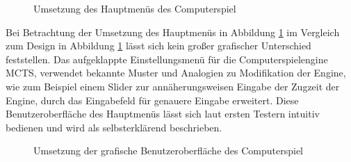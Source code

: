 \begin{figure}[!ht]
    \centering
    \caption{Umsetzung des Hauptmenüs des Computerspiel}
    \label{fig:final-main-ui}
\end{figure}

Bei Betrachtung der Umsetzung des Hauptmenüs in Abbildung \ref{fig:final-main-ui} im Vergleich zum Design in Abbildung \ref{fig:final-main-ui} lässt sich kein großer grafischer Unterschied feststellen. Das aufgeklappte Einstellungsmenü für die Computerspielengine \ac{MCTS}, verwendet bekannte Muster und Analogien zu Modifikation der Engine, wie zum Beispiel einem Slider zur annäherungsweisen Eingabe der Zugzeit der Engine, durch das Eingabefeld für genauere Eingabe erweitert. Diese Benutzeroberfläche des Hauptmenüs lässt sich laut ersten Testern intuitiv bedienen und wird als selbsterklärend beschrieben.

\pagebreak

\begin{figure}[!ht]
    \centering
    \caption{Umsetzung der grafische Benutzeroberfläche des Computerspiel}
    \label{fig:final-game-ui}
\end{figure}

